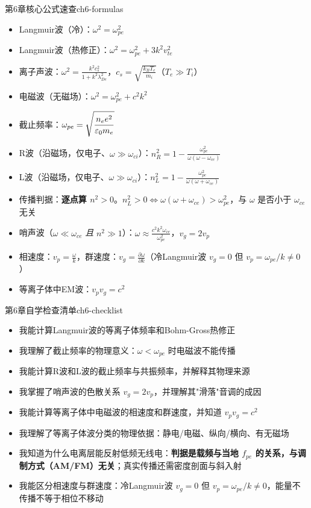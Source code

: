 \begin{formulabox}{第6章核心公式速查}{ch6-formulas}
\begin{itemize}[leftmargin=*,itemsep=0pt]
\item Langmuir波（冷）：$\displaystyle\omega^2 = \omega_{pe}^2$
\item Langmuir波（热修正）：$\displaystyle\omega^2 = \omega_{pe}^2 + 3k^2v_{te}^2$
\item 离子声波：$\displaystyle\omega^2 = \frac{k^2c_s^2}{1+k^2\lambda_{De}^2}$，$\displaystyle c_s = \sqrt{\frac{k_{\!B}T_e}{m_i}}$（$T_e\gg T_i$）
\item 电磁波（无磁场）：$\displaystyle\omega^2 = \omega_{pe}^2 + c^2k^2$
\item 截止频率：$\displaystyle\omega_{pe} = \sqrt{\frac{n_e e^2}{\varepsilon_0 m_e}}$
\item R波（沿磁场，仅电子、$\omega\gg\omega_{ci}$）：$\displaystyle n_R^2 = 1 - \frac{\omega_{pe}^2}{\omega(\omega-\omega_{ce})}$
\item L波（沿磁场，仅电子、$\omega\gg\omega_{ci}$）：$\displaystyle n_L^2 = 1 - \frac{\omega_{pe}^2}{\omega(\omega+\omega_{ce})}$
\item 传播判据：\textbf{逐点算 $n^2>0$}。$n_L^2>0\iff\omega(\omega+\omega_{ce})>\omega_{pe}^2$，与 $\omega$ 是否小于 $\omega_{ce}$ 无关
\item 哨声波（$\omega\ll\omega_{ce}$ \emph{且} $n^2\gg1$）：$\displaystyle\omega \approx \frac{c^2k^2\omega_{ce}}{\omega_{pe}^2}$，$v_g = 2v_p$
\item 相速度：$\displaystyle v_p = \frac{\omega}{k}$，群速度：$\displaystyle v_g = \frac{\partial\omega}{\partial k}$（冷Langmuir波 $v_g=0$ 但 $v_p=\omega_{pe}/k\neq0$）
\item 等离子体中EM波：$\displaystyle v_p v_g = c^2$
\end{itemize}
\end{formulabox}

\begin{checklistbox}{第6章自学检查清单}{ch6-checklist}
\begin{itemize}[leftmargin=*,label=$\square$]
\item 我能计算Langmuir波的等离子体频率和Bohm-Gross热修正
\item 我理解了截止频率的物理意义：$\omega < \omega_{pe}$ 时电磁波不能传播
\item 我能计算R波和L波的截止频率与共振频率，并解释其物理来源
\item 我掌握了哨声波的色散关系 $v_g = 2v_p$，并理解其"滑落"音调的成因
\item 我能计算等离子体中电磁波的相速度和群速度，并知道 $v_p v_g = c^2$
\item 我理解了等离子体波分类的物理依据：静电/电磁、纵向/横向、有无磁场
\item 我知道为什么电离层能反射低频无线电：\textbf{判据是载频与当地 $f_{pe}$ 的关系，与调制方式（AM/FM）无关}；真实传播还需密度剖面与斜入射
\item 我能区分相速度与群速度：冷Langmuir波 $v_g=0$ 但 $v_p=\omega_{pe}/k\neq0$，能量不传播不等于相位不移动
\end{itemize}
\end{checklistbox}

\endinput
